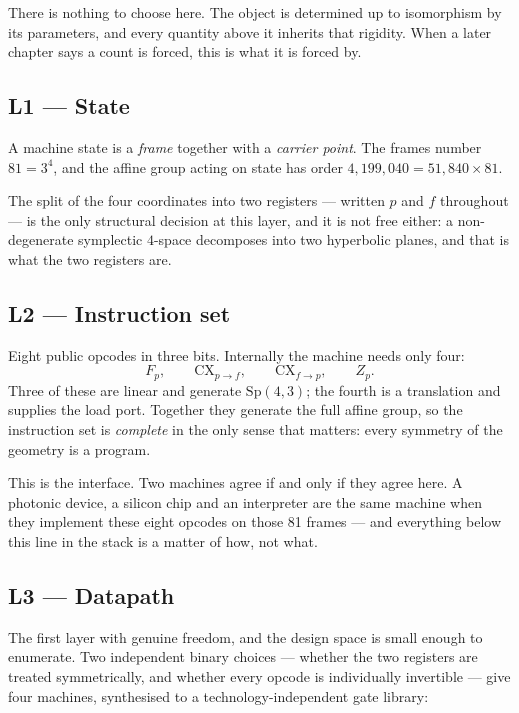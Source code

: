 There is nothing to choose here. The object is determined up to isomorphism by its
parameters, and every quantity above it inherits that rigidity. When a later chapter says a
count is forced, this is what it is forced by.

\subsection{L1 --- State}

A machine state is a \emph{frame} together with a \emph{carrier point}. The frames number
$81 = 3^4$, and the affine group acting on state has order
$4{,}199{,}040 = 51{,}840 \times 81$.

The split of the four coordinates into two registers --- written $p$ and $f$ throughout ---
is the only structural decision at this layer, and it is not free either: a non-degenerate
symplectic $4$-space decomposes into two hyperbolic planes, and that is what the two
registers are.

\subsection{L2 --- Instruction set}

Eight public opcodes in three bits. Internally the machine needs only four:
\[
  F_p, \qquad \mathrm{CX}_{p\to f}, \qquad \mathrm{CX}_{f\to p}, \qquad Z_p .
\]
Three of these are linear and generate $\mathrm{Sp}(4,3)$; the fourth is a translation and
supplies the load port. Together they generate the full affine group, so the instruction set
is \emph{complete} in the only sense that matters: every symmetry of the geometry is a
program.

\begin{plainbox}
This is the interface. Two machines agree if and only if they agree here. A photonic
device, a silicon chip and an interpreter are the same machine when they implement these
eight opcodes on those 81 frames --- and everything below this line in the stack is a
matter of how, not what.
\end{plainbox}

\subsection{L3 --- Datapath}

The first layer with genuine freedom, and the design space is small enough to enumerate.
Two independent binary choices --- whether the two registers are treated symmetrically, and
whether every opcode is individually invertible --- give four machines, synthesised to a
technology-independent gate library:

